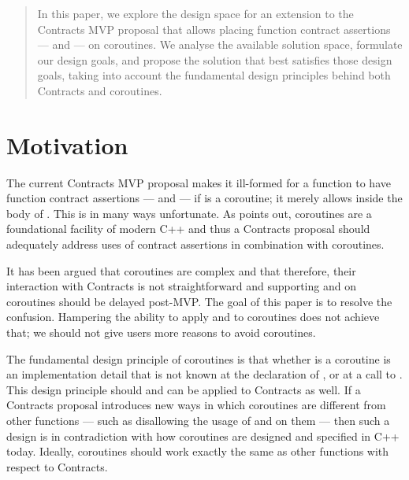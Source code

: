\begin{abstract}
In this paper, we explore the design space for an extension to the Contracts MVP proposal \cite{P2900R8} that allows placing function contract assertions ---  and 
 --- on coroutines. We analyse the available solution space, formulate our design goals, and propose the solution that best satisfies those design goals, taking into account the fundamental design principles behind both Contracts and coroutines.
\end{abstract}


\tableofcontents*





\section{Motivation}
\label{intro}

The current Contracts MVP proposal \cite{P2900R8} makes it ill-formed for a function  to have function contract assertions ---  and  --- if  is a coroutine; it merely allows  inside the body of . This is in many ways unfortunate. As \cite{P3173R0} points out, coroutines are a foundational facility of modern C++ and thus a Contracts proposal should adequately address uses of contract assertions in combination with coroutines.

It has been argued that coroutines are complex and that therefore, their interaction with Contracts is not straightforward and supporting  and  on coroutines should be delayed post-MVP. The goal of this paper is to resolve the confusion. Hampering the ability to apply  and  to coroutines does not achieve that; we should not give users more reasons to avoid coroutines.

The fundamental design principle of coroutines is that whether  is a coroutine is an implementation detail that is not known at the declaration of , or at a call to . This design principle should and can be applied to Contracts as well. If a Contracts proposal introduces new ways in which coroutines are different from other functions --- such as disallowing the usage of  and  on them --- then such a design is in contradiction with how coroutines are designed and specified in C++ today. Ideally, coroutines should work exactly the same as other functions with respect to Contracts.

